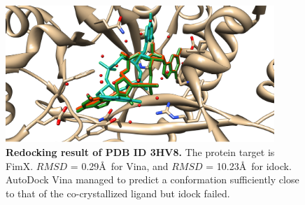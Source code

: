 \documentclass[10pt]{article}
\begin{document}
\begin{figure}[!ht]
\begin{center}
\includegraphics[width=4in]{Redocking3HV8.eps}
\end{center}
\caption{
{\bf Redocking result of PDB ID 3HV8.} The protein target is FimX. $RMSD$ = 0.29\AA\ for Vina, and $RMSD$ = 10.23\AA\ for idock. AutoDock Vina managed to predict a conformation sufficiently close to that of the co-crystallized ligand but idock failed.
}
\label{Redocking3HV8}
\end{figure}

\end{document}
